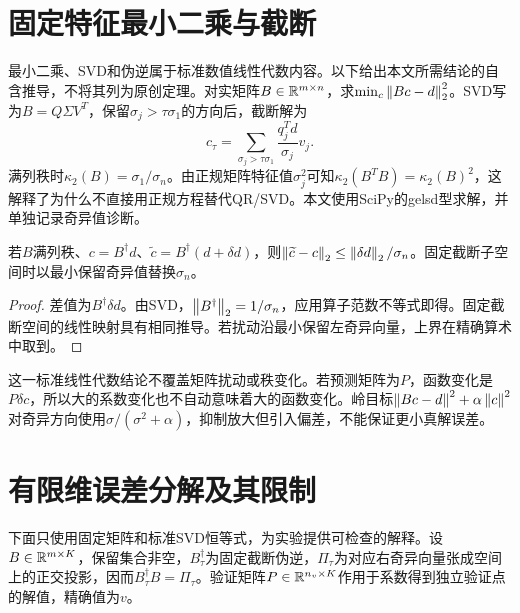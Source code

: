 
\section{固定特征最小二乘与截断}
最小二乘、SVD和伪逆属于标准数值线性代数内容\cite{golub}。以下给出本文所需结论的自含推导，不将其列为原创定理。对实矩阵$B\in\mathbb R^{m\times n}$，求$\min_c\left\lVert Bc-d\right\rVert_2^2$。SVD写为$B=Q\Sigma V^T$，保留$\sigma_j>\tau\sigma_1$的方向后，截断解为
\begin{equation}\label{eq:tsvd}
c_\tau=\sum_{\sigma_j>\tau\sigma_1}\frac{q_j^Td}{\sigma_j}v_j.
\end{equation}
满列秩时$\kappa_2(B)=\sigma_1/\sigma_n$。由正规矩阵特征值$\sigma_j^2$可知$\kappa_2(B^TB)=\kappa_2(B)^2$，这解释了为什么不直接用正规方程替代QR/SVD。本文使用SciPy的gelsd型求解，并单独记录奇异值诊断\cite{scipy}。

\begin{proposition}[固定矩阵右端扰动]
若$B$满列秩、$c=B^\dagger d$、$\widetilde c=B^\dagger(d+\delta d)$，则$\left\lVert\widetilde c-c\right\rVert_2\le\left\lVert\delta d\right\rVert_2/\sigma_n$。固定截断子空间时以最小保留奇异值替换$\sigma_n$。
\end{proposition}
\begin{proof}
差值为$B^\dagger\delta d$。由SVD，$\left\lVert B^\dagger\right\rVert_2=1/\sigma_n$，应用算子范数不等式即得。固定截断空间的线性映射具有相同推导。若扰动沿最小保留左奇异向量，上界在精确算术中取到。
\end{proof}
这一标准线性代数结论不覆盖矩阵扰动或秩变化。若预测矩阵为$P$，函数变化是$P\delta c$，所以大的系数变化也不自动意味着大的函数变化。岭目标$\left\lVert Bc-d\right\rVert^2+\alpha\left\lVert c\right\rVert^2$对奇异方向使用$\sigma/(\sigma^2+\alpha)$，抑制放大但引入偏差，不能保证更小真解误差。

\section{有限维误差分解及其限制}
下面只使用固定矩阵和标准SVD恒等式\cite{golub}，为实验提供可检查的解释。设$B\in\mathbb R^{m\times K}$，保留集合非空，$B_\tau^\dagger$为固定截断伪逆，$\Pi_\tau$为对应右奇异向量张成空间上的正交投影，因而$B_\tau^\dagger B=\Pi_\tau$。验证矩阵$P\in\mathbb R^{n_v\times K}$作用于系数得到独立验证点的解值，精确值为$v$。

